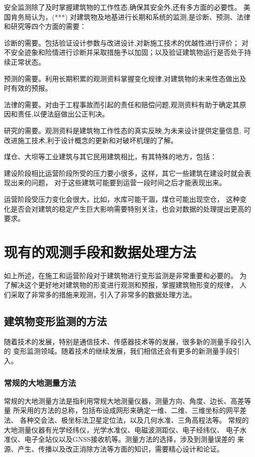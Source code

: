 安全监测除了及时掌握建筑物的工作性态,确保其安全外,还有多方面的必要性。
美国肯务局认为，(***)
对建筑物及地基进行长期和系统的监测,是诊断、预测、法律和研究等四个方面的需要：
\begin{asparaitem}[$\bullet$]
\item 诊断的需要。包括验证设计参数与改进设计,对新施工技术的优越性进行评价；
对不安全迹象和险情进行诊断并采取措施予以加固；以及验证建筑物运行是否处于持续正常状态。
\item 预测的需要。利用长期积累的观测资料掌握变化规律,对建筑物的未来性态做出及时有效的预报。
\item 法律的需要。对由于工程事故而引起的责任和赔偿问题,观测资料有助于确定其原因和责任,以便法庭做出公正判决。
\item 研究的需要。观测资料是建筑物工作性态的真实反映,为未来设计提供定量信息,
可改进施工技术,利于设计概念的更新和对破坏机理的了解。
\end{asparaitem}

煤仓、大坝等工业建筑与其它民用建筑相比，有其特殊的地方，包括：
\begin{asparaitem}[$\bullet$]
\item 建设阶段相比运营阶段所受的压力要小很多，这样，其它一些建筑在建设时就会表现出来的问题，
对于这些建筑可能要到运营一段时间之后才能表现出来。
\item 运营阶段受压力变化会很大，比如，水库可能干涸，煤仓可能出现空仓，
这种变化是否会对建筑的稳定产生巨大影响需要特别关注，也会对数据的处理提出更高的要求。
\end{asparaitem}

\section{现有的观测手段和数据处理方法}
如上所述，在施工和运营阶段对于建筑物进行变形监测是非常重要和必要的。
为了解决这个更好地对建筑物的形变进行观测和预报，掌握建筑物形变的规律，
人们采取了非常多的措施来观测，引入了非常多的数据处理方法。\cite{DEFOR07}

\subsection{建筑物变形监测的方法}
随着技术的发展，特别是通信技术、传感器技术等的发展，很多新的测量手段引入的
变形监测领域。随着技术的继续发展，我们相信还会有更多的新测量手段引入。
\subsubsection*{常规的大地测量方法}
常规的大地测量方法是指利用常规大地测量仪器，测量方向、角度、边长、高差等量
所采用的方法的总称，包括布设成网形来确定一维、二维、三维坐标的网平差法、
各种交会法、极坐标法卫星定位法，以及几何水准、三角高程法等。
常规的大地测量仪器有光学经纬仪，光学水准仪、电磁波测距仪、电子经纬仪、
电子水准仪、电子全站仪以及GNSS接收机等。测量方法的选择，涉及到测量误差的
来源、产生、传播以及改正消除方法等方面的知识，需要精心设计和论证。
